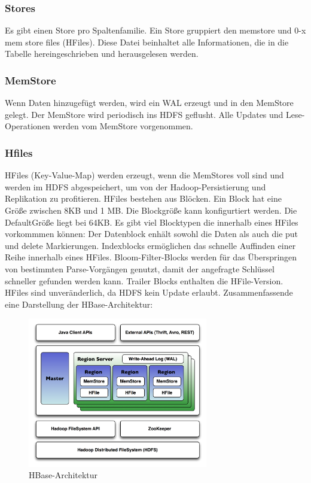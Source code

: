 \subsubsection{Stores}
Es gibt einen Store pro Spaltenfamilie. Ein Store gruppiert den memstore und 0-x mem store files (HFiles). Diese Datei beinhaltet alle Informationen, die in die Tabelle hereingeschrieben und herausgelesen werden.

\subsubsection{MemStore}
Wenn Daten hinzugefügt werden, wird ein \ac{WAL} erzeugt und in den MemStore gelegt. Der MemStore wird periodisch ins HDFS geflusht. Alle Updates und Lese-Operationen werden vom MemStore vorgenommen.

\subsubsection{Hfiles}
HFiles (Key-Value-Map) werden erzeugt, wenn die MemStores voll sind und werden im HDFS abgespeichert, um von der Hadoop-Persistierung und Replikation zu profitieren. HFiles bestehen aus Blöcken. Ein Block hat eine Größe zwischen 8KB und 1 MB. Die Blockgröße kann konfigurtiert werden.  Die DefaultGröße liegt bei 64KB. Es gibt viel Blocktypen die innerhalb eines HFiles vorkommmen können: Der Datenblock enhält sowohl die Daten als auch die put und delete Markierungen. Indexblocks ermöglichen das schnelle Auffinden einer Reihe innerhalb eines HFiles. Bloom-Filter-Blocks werden für das Überspringen von  bestimmten Parse-Vorgängen genutzt, damit der angefragte Schlüssel schneller gefunden werden kann. Trailer Blocks enthalten die HFile-Version. HFiles sind unveränderlich, da HDFS kein Update erlaubt.
Zusammenfassende eine Darstellung der HBase-Architektur:

\begin{figure}[htbp] 
  \centering
     \includegraphics[width=0.7\textwidth]{images/hbase-architecture.png}
  \caption{HBase-Architektur}
  \label{fig:HBase-Architektur}
\end{figure}



